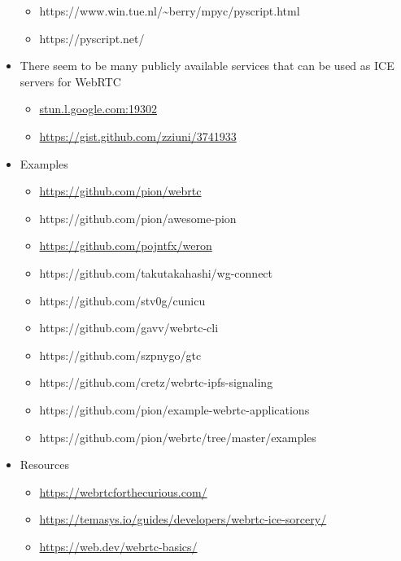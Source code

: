 \begin{itemize}
  \begin{itemize}
  \tightlist
  \item
    https://www.win.tue.nl/\textasciitilde berry/mpyc/pyscript.html
  \item
    https://pyscript.net/
  \end{itemize}
\item
  There seem to be many publicly available services that can be used as
  ICE servers for WebRTC

  \begin{itemize}
  \tightlist
  \item
    \href{http://stun.l.google.com:19302/}{stun.l.google.com:19302}
  \item
    \url{https://gist.github.com/zziuni/3741933}
  \end{itemize}
\item
  Examples

  \begin{itemize}
  \tightlist
  \item
    \url{https://github.com/pion/webrtc}
  \item
    https://github.com/pion/awesome-pion
  \item
    \url{https://github.com/pojntfx/weron}
  \item
    https://github.com/takutakahashi/wg-connect
  \item
    https://github.com/stv0g/cunicu
  \item
    https://github.com/gavv/webrtc-cli
  \item
    https://github.com/szpnygo/gtc
  \item
    https://github.com/cretz/webrtc-ipfs-signaling
  \item
    https://github.com/pion/example-webrtc-applications
  \item
    https://github.com/pion/webrtc/tree/master/examples
  \end{itemize}
\item
  Resources

  \begin{itemize}
  \tightlist
  \item
    \url{https://webrtcforthecurious.com/}
  \item
    \url{https://temasys.io/guides/developers/webrtc-ice-sorcery/}
  \item
    \href{https://web.dev/webrtc-basics/\#toc-rtcpeerconnection}{https://web.dev/webrtc-basics/}
  \end{itemize}
\end{itemize}

